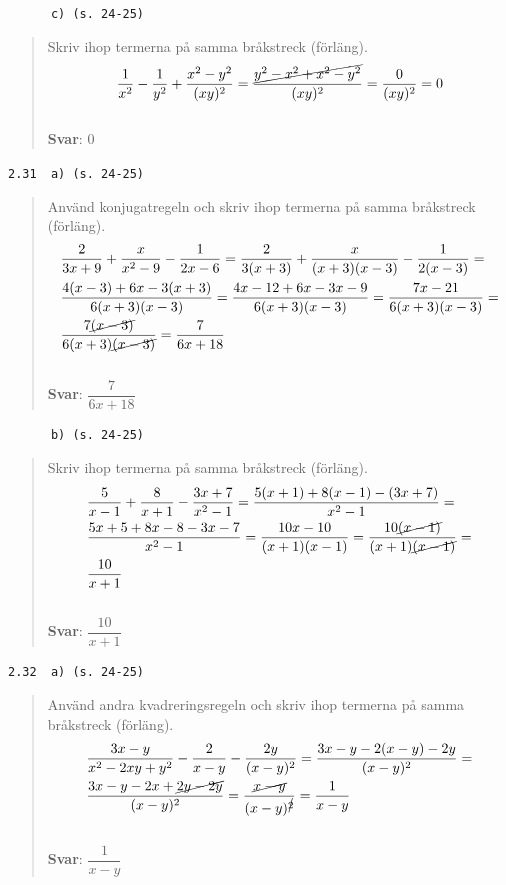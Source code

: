 \documentclass[a4paper]{article}
\newcommand{\tskcol}[1]{\textcolor{tskcol}{#1}}
\begin{document}
	\texttt{\tskcol{~~~~~~c) (s. 24-25)}}
	\begin{quotation}
		\noindent
		Skriv ihop termerna på samma bråkstreck (förläng).
		\[\frac{1}{x^2}-\frac{1}{y^2}+\frac{x^2-y^2}{(xy)^2}=
		\frac{\cancel{y^2-x^2+x^2-y^2}}{(xy)^2}=
		\frac{0}{(xy)^2}=
		0\]
		\\
		\textbf{Svar}: $0$
	\end{quotation}
	
	\texttt{\tskcol{2.31~~a) (s. 24-25)}}
	\begin{quotation}
		\noindent
		Använd konjugatregeln och skriv ihop termerna på samma bråkstreck (förläng).
		\begin{align*}
			& \frac{2}{3x+9}+\frac{x}{x^2-9}-\frac{1}{2x-6}=
			\frac{2}{3(x+3)}+\frac{x}{(x+3)(x-3)}-\frac{1}{2(x-3)}= \\
			& \frac{4(x-3)+6x-3(x+3)}{6(x+3)(x-3)}=
			\frac{4x-12+6x-3x-9}{6(x+3)(x-3)}=
			\frac{7x-21}{6(x+3)(x-3)}= \\
			& \frac{7\cancel{(x-3)}}{6(x+3)\cancel{(x-3)}}=
			\frac{7}{6x+18}
		\end{align*}
		\\
		\textbf{Svar}: $\dfrac{7}{6x+18}$
	\end{quotation}
	
	\texttt{\tskcol{~~~~~~b) (s. 24-25)}}
	\begin{quotation}
		\noindent
		Skriv ihop termerna på samma bråkstreck (förläng).
		\begin{align*}
			& \frac{5}{x-1}+\frac{8}{x+1}-\frac{3x+7}{x^2-1}=
			\frac{5(x+1)+8(x-1)-(3x+7)}{x^2-1}= \\
			& \frac{5x+5+8x-8-3x-7}{x^2-1}=
			\frac{10x-10}{(x+1)(x-1)}=
			\frac{10\cancel{(x-1)}}{(x+1)\cancel{(x-1)}}= \\
			& \frac{10}{x+1}
		\end{align*}
		\\
		\textbf{Svar}: $\dfrac{10}{x+1}$
	\end{quotation}
	
	\texttt{\tskcol{2.32~~a) (s. 24-25)}}
	\begin{quotation}
		\noindent
		Använd andra kvadreringsregeln och skriv ihop termerna på samma bråkstreck (förläng).
		\begin{align*}
			& \frac{3x-y}{x^2-2xy+y^2}-\frac{2}{x-y}-\frac{2y}{(x-y)^2}=
			\frac{3x-y-2(x-y)-2y}{(x-y)^2}= \\
			& \frac{3x-y-2x+\cancel{2y-2y}}{(x-y)^2}=
			\frac{\cancel{x-y}}{(x-y)^{\cancel{2}}}=
			\frac{1}{x-y}
		\end{align*}
		\\
		\textbf{Svar}: $\dfrac{1}{x-y}$
	\end{quotation}
	
\end{document}
